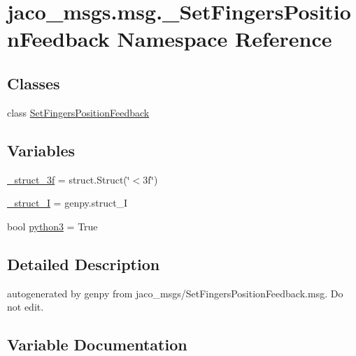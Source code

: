\hypertarget{namespacejaco__msgs_1_1msg_1_1__SetFingersPositionFeedback}{}\section{jaco\+\_\+msgs.\+msg.\+\_\+\+Set\+Fingers\+Position\+Feedback Namespace Reference}
\label{namespacejaco__msgs_1_1msg_1_1__SetFingersPositionFeedback}
\subsection*{Classes}
\begin{DoxyCompactItemize}
\item 
class \hyperlink{classjaco__msgs_1_1msg_1_1__SetFingersPositionFeedback_1_1SetFingersPositionFeedback}{Set\+Fingers\+Position\+Feedback}
\end{DoxyCompactItemize}
\subsection*{Variables}
\begin{DoxyCompactItemize}
\item 
\hyperlink{namespacejaco__msgs_1_1msg_1_1__SetFingersPositionFeedback_a14e03a196e67fe434a7dc299c0562686}{\+\_\+struct\+\_\+3f} = struct.\+Struct(\char`\"{}$<$3f\char`\"{})
\item 
\hyperlink{namespacejaco__msgs_1_1msg_1_1__SetFingersPositionFeedback_a598d54fc8721a0b8146c769dae4f5d5a}{\+\_\+struct\+\_\+I} = genpy.\+struct\+\_\+I
\item 
bool \hyperlink{namespacejaco__msgs_1_1msg_1_1__SetFingersPositionFeedback_a2d4dc2ef49f7bf33e2f5c6b4ad50ac8e}{python3} = True
\end{DoxyCompactItemize}


\subsection{Detailed Description}
\begin{DoxyVerb}autogenerated by genpy from jaco_msgs/SetFingersPositionFeedback.msg. Do not edit.\end{DoxyVerb}
 

\subsection{Variable Documentation}
